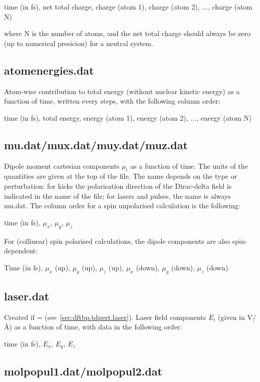 time (in fs), net total charge, charge (atom 1), charge (atom 2), ...,
charge (atom N)

where N is the number of atoms, and the net total charge should always
be zero (up to numerical presicion) for a neutral system.

\subsection{atomenergies.dat}

Atom-wise contribution to total energy (without nuclear kinetic energy)
as a function of time, written every  steps, with the
following column order:

time (in fs), total energy, energy (atom 1), energy (atom 2), ...,
energy (atom N)

\subsection{mu.dat/mux.dat/muy.dat/muz.dat}

Dipole moment cartesian components $\mu_i$ as a function of time. The
units of the quantities are given at the top of the file. The name
depends on the type or perturbation: for kicks the polarisation
direction of the Dirac-delta field is indicated in the name of the
file; for lasers and pulses, the name is always mu.dat. The column
order for a spin unpolarised calculation is the following:

time (in fs), $\mu_x$, $\mu_y$, $\mu_z$

For (collinear) spin polarised calculations, the dipole components are
also spin-dependent:

Time (in fs), $\mu_x$ (up), $\mu_y$ (up), $\mu_z$ (up), $\mu_x$
(down), $\mu_y$ (down), $\mu_z$ (down).

\subsection{laser.dat}

Created if  = 
(see~\ref{sec:dftbp.tdpert.laser}). Laser field components $E_i$ (given in
V/\AA) as a function of time, with data in the following order:

time (in fs), $E_x$, $E_y$, $E_z$

\subsection{molpopul1.dat/molpopul2.dat}

